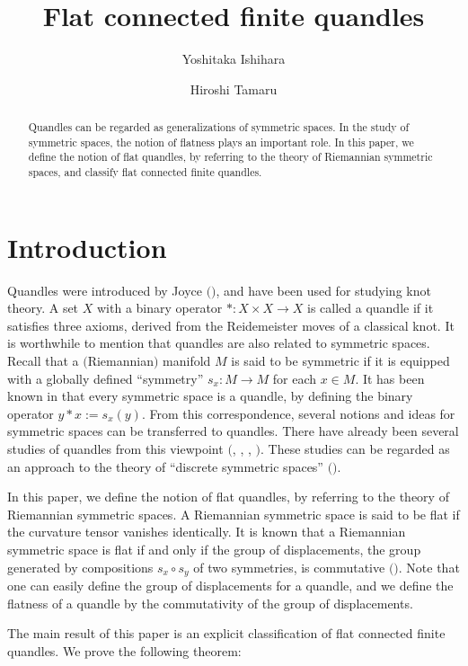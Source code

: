 \documentclass[12pt]{amsart}
\title{Flat connected finite quandles}
\author{Yoshitaka Ishihara}
\author{Hiroshi Tamaru}
\date{}
\theoremstyle{definition}
\begin{document}
\maketitle

\begin{abstract}
Quandles can be regarded as generalizations of symmetric spaces. 
In the study of symmetric spaces, 
the notion of flatness plays an important role. 
In this paper, we define the notion of flat quandles, 
by referring to the theory of Riemannian symmetric spaces, 
and classify flat connected finite quandles. 
\end{abstract}

\section{Introduction}

Quandles were introduced by Joyce $($\cite{Joyce}$)$, and have been used for studying knot theory. A set $ X $ with a binary operator $ \ast : X \times X \rightarrow X $ is called a quandle if it satisfies three axioms, derived from the Reidemeister moves of a classical knot. It is worthwhile to mention that quandles are also related to symmetric spaces. Recall that a $($Riemannian$)$ manifold $ M $ is said to be symmetric if it is equipped with a globally defined ``symmetry'' $ s_{x} : M \rightarrow M $ for each $ x \in M $. It has been known in \cite{Joyce} that every symmetric space is a quandle, by defining the binary operator $ y \ast x := s_{x}(y) $. From this correspondence, several notions and ideas for symmetric spaces can be transferred to quandles. There have already been several studies of quandles from this viewpoint $($\cite{K.T.W.}, \cite{Tamaru}, \cite{Vendramin}, \cite{Wada}$)$. These studies can be regarded as an approach to the theory of ``discrete symmetric spaces'' $($\cite{Tamaru}$)$.

In this paper, we define the notion of flat quandles, by referring to the theory of Riemannian symmetric spaces. A Riemannian symmetric space is said to be flat if the curvature tensor vanishes identically. It is known that a Riemannian symmetric space is flat if and only if the group of displacements, the group generated by compositions $ s_{x} \circ s_{y} $ of two symmetries, is commutative $($\cite{Loos}$)$. Note that one can easily define the group of displacements for a quandle, and we define the flatness of a quandle by the commutativity of the group of displacements.

The main result of this paper is an explicit classification of flat connected finite quandles. We prove the following theorem:
\end{document}
